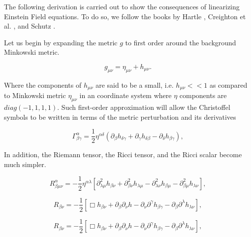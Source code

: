 \FloatBarrier

The following derivation is carried out to show the consequences of linearizing Einstein Field equations. To do so, we follow the books by Hartle \cite{Hartle:2021pel}, Creighton et al. \cite{Creighton:2011zz}, and Schutz \cite{Schutz:1985jx}. 

Let us begin by expanding the metric $g$ to first order around the background Minkowski metric. 

\begin{equation}\label{metric}
g_{\mu \nu} =  \eta_{\mu \nu} + h_{\mu \nu}.
\end{equation}

Where the components of $h_{\mu \nu}$ are said to be a small, i.e. $h_{\mu \nu}<<1$ as compared to Minkowski metric $\eta_{\mu \nu}$  in an coordinate system where $\eta$ components are $diag(-1,1,1,1)$. Such first-order approximation will allow the Christoffel symbols to be written in terms of the metric perturbation and its derivatives

\begin{equation}\label{cris}
\Gamma^{\alpha}_{\beta \gamma} = \frac{1}{2} \eta^{\alpha \delta}(\partial_{\beta} h_{\delta \gamma} + \partial_{\gamma} h_{\delta \beta} - \partial_{\delta} h_{\beta \gamma}),
\end{equation}

In addition, the Riemann tensor, the Ricci tensor, and the Ricci scalar become much simpler.

\begin{equation}
R^{\alpha}_{\beta \mu\nu} = -\frac{1}{2} \eta^{\alpha \lambda} [ \partial^2_{\lambda \mu} h_{\beta \nu} + \partial^2_{\beta \nu} h_{\lambda \mu} - \partial^2_{\lambda \nu} h_{\beta \mu} - \partial^2_{\beta \mu} h_{\lambda \nu}],
\end{equation}

\begin{equation}
R_{\beta \nu} = -\frac{1}{2} [ \Box h_{\beta \nu} + \partial_{\beta}\partial_{\nu} h - \partial_{\nu} \partial^{\gamma} h_{\beta \gamma} - \partial_{\beta} \partial^{\lambda} h_{\lambda \nu} ],
\end{equation}

\begin{equation}\label{mcieuf}
R_{\beta \nu} = -\frac{1}{2} [ \Box h_{\beta \nu} + \partial_{\beta}\partial_{\nu} h - \partial_{\nu} \partial^{\gamma} h_{\beta \gamma} - \partial_{\beta} \partial^{\lambda} h_{\lambda \nu} ],
\end{equation}


